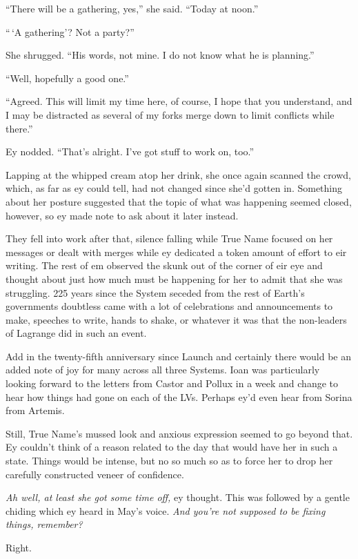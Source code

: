 ``There will be a gathering, yes,'' she said. ``Today at noon.''

``\,`A gathering'? Not a party?''

She shrugged. ``His words, not mine. I do not know what he is planning.''

``Well, hopefully a good one.''

``Agreed. This will limit my time here, of course, I hope that you understand, and I may be distracted as several of my forks merge down to limit conflicts while there.''

Ey nodded. ``That's alright. I've got stuff to work on, too.''

Lapping at the whipped cream atop her drink, she once again scanned the crowd, which, as far as ey could tell, had not changed since she'd gotten in. Something about her posture suggested that the topic of what was happening seemed closed, however, so ey made note to ask about it later instead.

They fell into work after that, silence falling while True Name focused on her messages or dealt with merges while ey dedicated a token amount of effort to eir writing. The rest of em observed the skunk out of the corner of eir eye and thought about just how much must be happening for her to admit that she was struggling. 225 years since the System seceded from the rest of Earth's governments doubtless came with a lot of celebrations and announcements to make, speeches to write, hands to shake, or whatever it was that the non-leaders of Lagrange did in such an event.

Add in the twenty-fifth anniversary since Launch and certainly there would be an added note of joy for many across all three Systems. Ioan was particularly looking forward to the letters from Castor and Pollux in a week and change to hear how things had gone on each of the LVs. Perhaps ey'd even hear from Sorina from Artemis.

Still, True Name's mussed look and anxious expression seemed to go beyond that. Ey couldn't think of a reason related to the day that would have her in such a state. Things would be intense, but no so much so as to force her to drop her carefully constructed veneer of confidence.

\emph{Ah well, at least she got some time off,} ey thought. This was followed by a gentle chiding which ey heard in May's voice. \emph{And you're not supposed to be fixing things, remember?}

Right.

